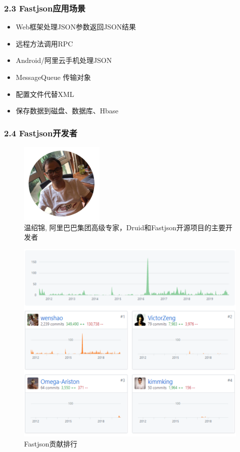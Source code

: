 \documentclass{article}
\begin{document}
\subsubsection*{2.3	Fastjson应用场景}
\begin{itemize}
\item Web框架处理JSON参数返回JSON结果
\item 远程方法调用RPC
\item Android/阿里云手机处理JSON
\item MessageQueue 传输对象
\item 配置文件代替XML
\item 保存数据到磁盘、数据库、Hbase
\end{itemize}

\subsubsection*{2.4	Fastjson开发者}
\begin{figure}[H]
\centering %
\includegraphics[width = 4cm]{pic6_1.png}
\caption{温绍锦, 阿里巴巴集团高级专家，Druid和Fastjson开源项目的主要开发者}
\end{figure}
\begin{figure}[H]
\centering %
\includegraphics[width = 13cm]{pic6_2.png}
\caption{Fastjson贡献排行}
\end{figure}
\end{document}
